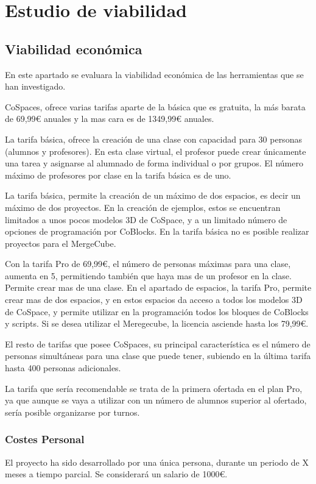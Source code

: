 \section{Estudio de viabilidad}

\subsection{Viabilidad económica}

En este apartado se evaluara la viabilidad económica de las herramientas que se han investigado.


CoSpaces, ofrece varias tarifas aparte de la básica que es gratuita, la más barata de 69,99\euro{}  anuales y la mas cara es de 1349,99\euro{} anuales.

La tarifa básica, ofrece la creación de una clase con capacidad para 30 personas (alumnos y profesores). En esta clase virtual, el profesor puede crear únicamente una tarea y asignarse al alumnado de forma individual o por grupos. El número máximo de profesores por clase en la tarifa básica es de uno.

La tarifa básica, permite la creación de un máximo de dos espacios, es decir un máximo de dos proyectos. En la creación de ejemplos, estos se encuentran limitados a unos pocos modelos 3D de CoSpace, y a un limitado número de opciones de programación por CoBlocks. En la tarifa básica no es posible realizar proyectos para el MergeCube.

Con la tarifa Pro de 69,99\euro{}, el número de personas máximas para una clase, aumenta en 5, permitiendo también que haya mas de un profesor en la clase. Permite crear mas de una clase. En el apartado de espacios, la tarifa Pro, permite crear mas de dos espacios, y en estos espacios da acceso a todos los modelos 3D de CoSpace, y permite utilizar en la programación todos los bloques de CoBlocks y scripts.
Si se desea utilizar el Meregecube, la licencia asciende hasta los 79,99\euro{}. 

El resto de tarifas que posee CoSpaces, su principal característica es el número de personas simultáneas para una clase que puede tener, subiendo en la última tarifa hasta 400 personas adicionales.

La tarifa que sería recomendable se trata de la primera ofertada en el plan Pro, ya que aunque se vaya a utilizar con un número de alumnos superior al ofertado, sería posible organizarse por turnos.

\subsubsection{Costes Personal}
El proyecto ha sido desarrollado por una única persona, durante un periodo de X meses a tiempo parcial. Se considerará un salario de 1000\euro.

